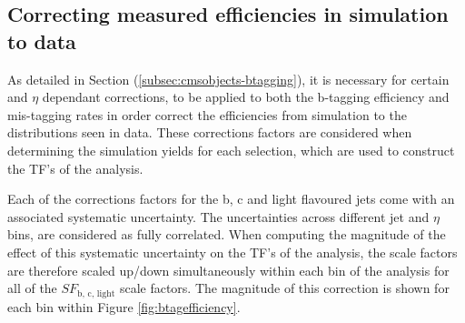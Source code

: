 \subsection{Correcting measured efficiencies in simulation to data}
\label{subsec:formulamethodsf}

As detailed in Section (\ref{subsec:cmsobjects-btagging}), it is necessary for certain \pt and $\eta$ dependant corrections, to be applied to both the b-tagging efficiency and mis-tagging rates in order correct the efficiencies from simulation to the distributions seen in data. These corrections factors are considered when determining the simulation yields for each selection, which are used to construct the \ac{TF}'s of the analysis. 

Each of the corrections factors for the b, c and light flavoured jets come with an associated systematic uncertainty. The uncertainties across different jet \pt and $\eta$ bins, are considered as fully correlated. When computing the magnitude of the effect of this systematic uncertainty on the \ac{TF}'s of the analysis, the scale factors are therefore scaled up/down simultaneously within each \theht bin of the analysis for all of the $SF_{\text{b, c, light}}$ scale factors. The magnitude of this correction is shown for each \theht bin within Figure \ref{fig:btagefficiency}. 

